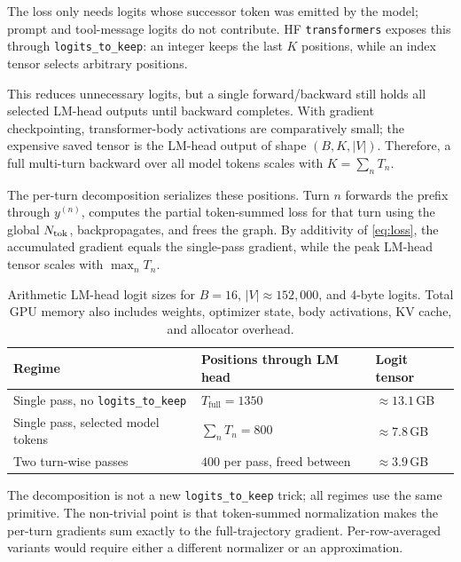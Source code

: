 \documentclass[11pt,a4paper]{article}
\begin{document}
The loss only needs logits whose successor token was emitted by the model; prompt and tool-message logits do not contribute. HF \texttt{transformers} exposes this through \texttt{logits\_to\_keep}: an integer keeps the last $K$ positions, while an index tensor selects arbitrary positions.

This reduces unnecessary logits, but a single forward/backward still holds all selected LM-head outputs until backward completes. With gradient checkpointing, transformer-body activations are comparatively small; the expensive saved tensor is the LM-head output of shape $(B,K,|V|)$. Therefore, a full multi-turn backward over all model tokens scales with $K=\sum_n T_n$.

The per-turn decomposition serializes these positions. Turn $n$ forwards the prefix through $y^{(n)}$, computes the partial token-summed loss for that turn using the global $N_{\rm tok}$, backpropagates, and frees the graph. By additivity of \eqref{eq:loss}, the accumulated gradient equals the single-pass gradient, while the peak LM-head tensor scales with $\max_n T_n$.

\begin{table}[h]
\centering
\small
\begin{tabular}{@{}lll@{}}
\toprule
Regime & Positions through LM head & Logit tensor \\
\midrule
Single pass, no \texttt{logits\_to\_keep} & $T_{\text{full}} = 1350$ & $\approx 13.1$\,GB \\
Single pass, selected model tokens & $\sum_n T_n = 800$ & $\approx 7.8$\,GB \\
Two turn-wise passes & $400$ per pass, freed between & $\approx 3.9$\,GB \\
\bottomrule
\end{tabular}
\caption{Arithmetic LM-head logit sizes for $B=16$, $|V|\approx 152{,}000$, and 4-byte logits. Total GPU memory also includes weights, optimizer state, body activations, KV cache, and allocator overhead.}
\label{tab:memory}
\end{table}

The decomposition is not a new \texttt{logits\_to\_keep} trick; all regimes use the same primitive. The non-trivial point is that token-summed normalization makes the per-turn gradients sum exactly to the full-trajectory gradient. Per-row-averaged variants would require either a different normalizer or an approximation.
\end{document}
